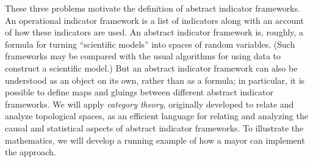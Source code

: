 \documentclass{article}
\theoremstyle{definition}
\newcommand{\Cat}[1]{\mathsf{#1}}
\def\Ind{\Cat{Ind}}
\begin{document}

These three problems motivate the definition of abstract indicator frameworks. An operational indicator framework is a list of indicators along with an account of how these indicators are used. An abstract indicator framework is, roughly, a formula for turning ``scientific models'' into spaces of random variables. (Such frameworks may be compared with the usual algorithms for using data to construct a scientific model.) But an abstract indicator framework can also be understood as an object on its own, rather than as a formula; in particular, it is possible to define maps and gluings between different abstract indicator frameworks. We will apply \emph{category theory}, originally developed to relate and analyze topological spaces, as an efficient language for relating and analyzing the causal and statistical aspects of abstract indicator frameworks. To illustrate the mathematics, we will develop a running example of how a mayor can implement the approach.


\end{document}
